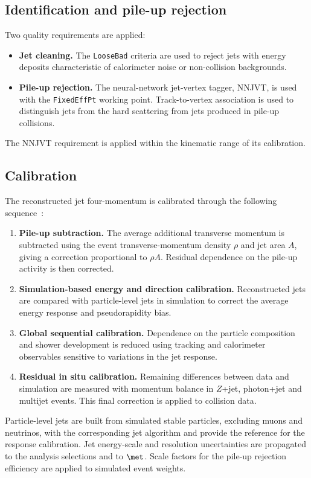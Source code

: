\subsection{Identification and pile-up rejection}

Two quality requirements are applied:
\begin{itemize}
    \item \textbf{Jet cleaning.} The \texttt{LooseBad} criteria are used to reject jets with energy deposits characteristic of calorimeter noise or non-collision backgrounds.
    \item \textbf{Pile-up rejection.} The neural-network jet-vertex tagger, NNJVT, is used with the \texttt{FixedEffPt} working point. Track-to-vertex association is used to distinguish jets from the hard scattering from jets produced in pile-up collisions.
\end{itemize}
The NNJVT requirement is applied within the kinematic range of its calibration.

\subsection{Calibration}

The reconstructed jet four-momentum is calibrated through the following sequence~\cite{ATLAS2021JetCalibration}:
\begin{enumerate}
    \item \textbf{Pile-up subtraction.} The average additional transverse momentum is subtracted using the event transverse-momentum density $\rho$ and jet area $A$, giving a correction proportional to $\rho A$. Residual dependence on the pile-up activity is then corrected.
    \item \textbf{Simulation-based energy and direction calibration.} Reconstructed jets are compared with particle-level jets in simulation to correct the average energy response and pseudorapidity bias.
    \item \textbf{Global sequential calibration.} Dependence on the particle composition and shower development is reduced using tracking and calorimeter observables sensitive to variations in the jet response.
    \item \textbf{Residual in situ calibration.} Remaining differences between data and simulation are measured with momentum balance in $Z$+jet, photon+jet and multijet events. This final correction is applied to collision data.
\end{enumerate}
Particle-level jets are built from simulated stable particles, excluding muons and neutrinos, with the corresponding jet algorithm and provide the reference for the response calibration.
Jet energy-scale and resolution uncertainties are propagated to the analysis selections and to $\met$.
Scale factors for the pile-up rejection efficiency are applied to simulated event weights.
